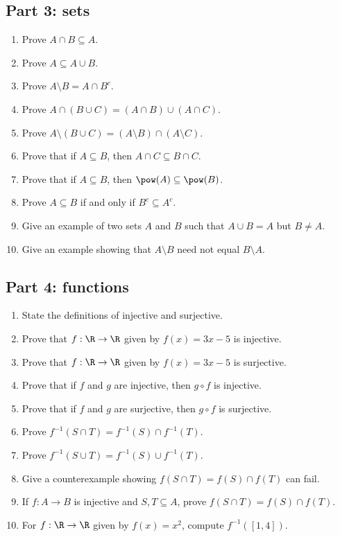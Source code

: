 \subsection{Part 3: sets}

\begin{enumerate}
\item Prove $A\cap B\subseteq A$.
\item Prove $A\subseteq A\cup B$.
\item Prove $A\setminus B=A\cap B^c$.
\item Prove $A\cap(B\cup C)=(A\cap B)\cup(A\cap C)$.
\item Prove $A\setminus(B\cup C)=(A\setminus B)\cap(A\setminus C)$.
\item Prove that if $A\subseteq B$, then $A\cap C\subseteq B\cap C$.
\item Prove that if $A\subseteq B$, then $\pow(A)\subseteq\pow(B)$.
\item Prove $A\subseteq B$ if and only if $B^c\subseteq A^c$.
\item Give an example of two sets $A$ and $B$ such that $A\cup B=A$ but $B\neq A$.
\item Give an example showing that $A\setminus B$ need not equal $B\setminus A$.
\end{enumerate}

\subsection{Part 4: functions}

\begin{enumerate}
\item State the definitions of injective and surjective.
\item Prove that $f:\R\to\R$ given by $f(x)=3x-5$ is injective.
\item Prove that $f:\R\to\R$ given by $f(x)=3x-5$ is surjective.
\item Prove that if $f$ and $g$ are injective, then $g\circ f$ is injective.
\item Prove that if $f$ and $g$ are surjective, then $g\circ f$ is surjective.
\item Prove $f^{-1}(S\cap T)=f^{-1}(S)\cap f^{-1}(T)$.
\item Prove $f^{-1}(S\cup T)=f^{-1}(S)\cup f^{-1}(T)$.
\item Give a counterexample showing $f(S\cap T)=f(S)\cap f(T)$ can fail.
\item If $f:A\to B$ is injective and $S,T\subseteq A$, prove $f(S\cap T)=f(S)\cap f(T)$.
\item For $f:\R\to\R$ given by $f(x)=x^2$, compute $f^{-1}([1,4])$.
\end{enumerate}

